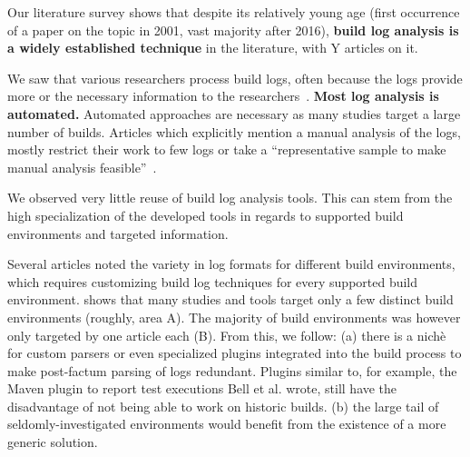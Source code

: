 Our literature survey shows that despite its relatively young age
(first occurrence of a paper on the topic in 2001, vast majority after
2016), \textbf{build log analysis is a widely established technique}
in the literature, with Y articles on it.


We saw that various researchers process build logs, often because the
logs provide more or the necessary
information to the researchers~\cite{ren2018automated}.
\textbf{Most log analysis is automated.} Automated approaches are
necessary as many studies target a large
number of builds.
Articles
which explicitly mention a manual analysis of the logs, mostly
restrict their work to few logs or take a ``representative sample to
make manual analysis feasible''~\cite{zolfagharinia2017not}.

We observed very little reuse of build log analysis tools.
This can stem from the
high specialization of the developed tools in regards to supported
build environments and targeted information.

Several articles noted the variety in log formats for different build
environments, which requires customizing build log techniques for
every supported build environment.
 shows that many studies and tools target
only a few distinct build environments (roughly, area A).
The majority of build environments was however only targeted by one
article each (B).
From this, we follow: (a) there is a nichè for custom parsers or even
specialized plugins integrated into the build process to make
post-factum
parsing of logs redundant.
Plugins  similar to, for example, the Maven plugin to report test
executions Bell et al.
wrote, still have the disadvantage of not being able to work on historic
builds.
(b) the large tail of seldomly-investigated environments would benefit
from the existence of a more generic
solution.

